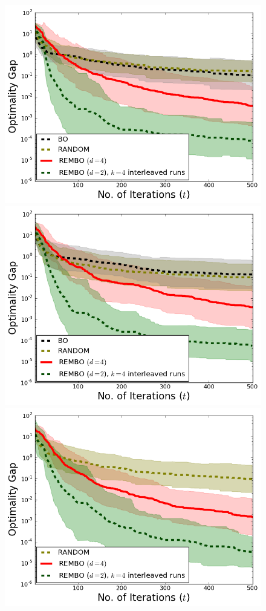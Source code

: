 \documentclass{article}
\begin{document}
\begin{figure}[t!]
\centering
  \includegraphics[scale=0.3]{figures/branin_dis_25D.png}
  \includegraphics[scale=0.3]{figures/branin_dis_rotation.png}
  \includegraphics[scale=0.3]{figures/branin_dis_1bil.png}

\end{figure}
\end{document}
